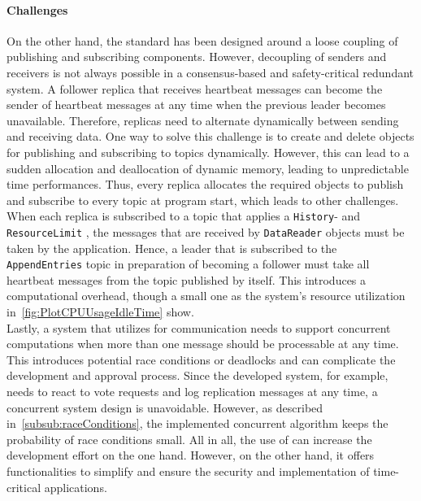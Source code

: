 \paragraph{Challenges}
On the other hand, the  standard has been designed around a loose coupling of publishing and subscribing components.
However, decoupling of senders and receivers is not always possible in a consensus-based and safety-critical redundant system.
A follower replica that receives heartbeat messages can become the sender of heartbeat messages at any time when the previous leader becomes unavailable.
Therefore, replicas need to alternate dynamically between sending and receiving data.
One way to solve this challenge is to create and delete objects for publishing and subscribing to topics dynamically.
However, this can lead to a sudden allocation and deallocation of dynamic memory, leading to unpredictable time performances.
Thus, every replica allocates the required objects to publish and subscribe to every topic at program start, which leads to other challenges.
\\

When each replica is subscribed to a topic that applies a \texttt{History}- and \texttt{ResourceLimit} , the messages that are received by \texttt{DataReader} objects must be taken by the application.
Hence, a leader that is subscribed to the \texttt{AppendEntries} topic in preparation of becoming a follower must take all heartbeat messages from the topic published by itself.
This introduces a computational overhead, though a small one as the system's resource utilization in~\autoref{fig:PlotCPUUsageIdleTime} show.
\\

Lastly, a system that utilizes  for communication needs to support concurrent computations when more than one message should be processable at any time.
This introduces potential race conditions or deadlocks and can complicate the development and approval process.
Since the developed system, for example, needs to react to vote requests and log replication messages at any time, a concurrent system design is unavoidable.
However, as described in~\autoref{subsub:raceConditions}, the implemented concurrent algorithm keeps the probability of race conditions small.
All in all, the use of  can increase the development effort on the one hand. However, on the other hand, it offers functionalities to simplify and ensure the security and implementation of time-critical applications.



